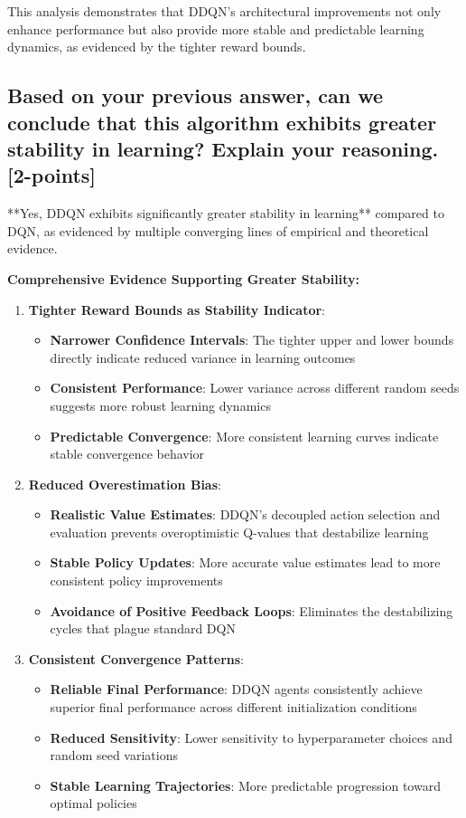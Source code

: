 \documentclass[12pt]{article}
\begin{document}
{{{This analysis demonstrates that DDQN's architectural improvements not only enhance performance but also provide more stable and predictable learning dynamics, as evidenced by the tighter reward bounds.

\subsection{Based on your previous answer, can we conclude that this algorithm exhibits greater stability in learning? Explain your reasoning. [2-points]}

**Yes, DDQN exhibits significantly greater stability in learning** compared to DQN, as evidenced by multiple converging lines of empirical and theoretical evidence.

\textbf{Comprehensive Evidence Supporting Greater Stability:}

\begin{enumerate}
    \item \textbf{Tighter Reward Bounds as Stability Indicator}:
    \begin{itemize}
        \item \textbf{Narrower Confidence Intervals}: The tighter upper and lower bounds directly indicate reduced variance in learning outcomes
        \item \textbf{Consistent Performance}: Lower variance across different random seeds suggests more robust learning dynamics
        \item \textbf{Predictable Convergence}: More consistent learning curves indicate stable convergence behavior
    \end{itemize}
    
    \item \textbf{Reduced Overestimation Bias}:
    \begin{itemize}
        \item \textbf{Realistic Value Estimates}: DDQN's decoupled action selection and evaluation prevents overoptimistic Q-values that destabilize learning
        \item \textbf{Stable Policy Updates}: More accurate value estimates lead to more consistent policy improvements
        \item \textbf{Avoidance of Positive Feedback Loops}: Eliminates the destabilizing cycles that plague standard DQN
    \end{itemize}
    
    \item \textbf{Consistent Convergence Patterns}:
    \begin{itemize}
        \item \textbf{Reliable Final Performance}: DDQN agents consistently achieve superior final performance across different initialization conditions
        \item \textbf{Reduced Sensitivity}: Lower sensitivity to hyperparameter choices and random seed variations
        \item \textbf{Stable Learning Trajectories}: More predictable progression toward optimal policies
    \end{itemize}
    

\end{enumerate}}}}
\end{document}
